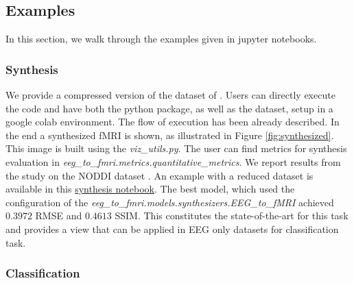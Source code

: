 \subsection{Examples}\label{section:examples}

In this section, we walk through the examples given in jupyter notebooks. 

\subsubsection{Synthesis}\label{section:synthesis}


We provide a compressed version of the dataset of \cite{dataset2014noddi}. Users can directly execute the code and have both the python package, as well as the dataset, setup in a google colab environment. The flow of execution has been already described. In the end a synthesized fMRI is shown, as illustrated in Figure \ref{fig:synthesized}. This image is built using the \textit{viz\_utils.py}. The user can find metrics for synthesis evaluation in \textit{eeg\_to\_fmri.metrics.quantitative\_metrics}. We report results from the \cite{calhas2022eeg} study on the NODDI dataset \cite{dataset2014noddi}. An example with a reduced dataset is available in this \href{https://github.com/eeg-to-fmri/eeg-to-fmri/blob/main/examples/synthesis.ipynb}{synthesis notebook}. The best model, which used the configuration of the \textit{eeg\_to\_fmri.models.synthesizers.EEG\_to\_fMRI} achieved $0.3972$  RMSE and $0.4613$ SSIM. This constitutes the state-of-the-art for this task and provides a view that can be applied in EEG only datasets for classification task.

\subsubsection{Classification}\label{section:classification}

